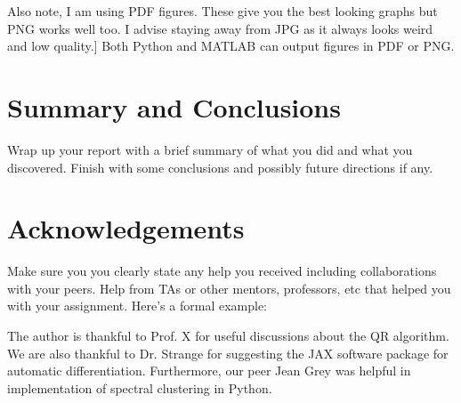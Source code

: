 \documentclass[11pt]{amsart}
\begin{document}
Also note, I am using PDF figures. These give you the best looking graphs but PNG works 
well too. I advise staying away from JPG as it always looks weird and low quality.]
Both Python and MATLAB can output figures in PDF or PNG.

\section{Summary and Conclusions}\label{sec:conclusions}
Wrap up your report with a brief summary of what you did and what you discovered. 
Finish with some conclusions and possibly future directions if any. 

\section*{Acknowledgements}

Make sure you you clearly state any help you received including collaborations 
with your peers. Help from TAs or other mentors, professors, etc that helped you 
with your assignment. Here's a formal example: 

The author is thankful to Prof. X for useful discussions about the QR algorithm. 
We are also thankful to Dr. Strange for suggesting the JAX software package for 
automatic differentiation. Furthermore, our peer Jean Grey was helpful in 
implementation of spectral clustering in Python.


\end{document}
